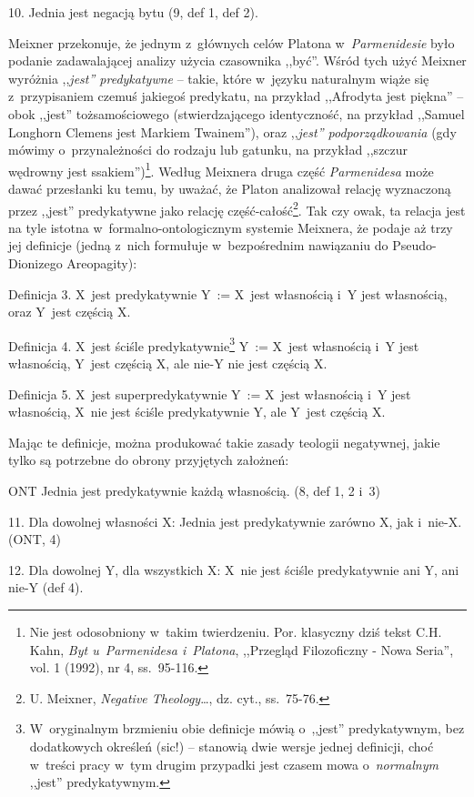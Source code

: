 10. Jednia jest negacją bytu (9, def 1, def 2).

Meixner przekonuje, że jednym z~głównych celów Platona w~\textit{Parmenidesie} było podanie zadawalającej analizy użycia czasownika ,,być''. Wśród tych użyć Meixner wyróżnia ,,\textit{jest'' predykatywne} -- takie, które w~języku naturalnym wiąże się z~przypisaniem czemuś jakiegoś predykatu, na przykład ,,Afrodyta jest piękna'' -- obok ,,jest'' tożsamościowego (stwierdzającego identyczność, na przykład ,,Samuel Longhorn Clemens jest Markiem Twainem''), oraz ,,\textit{jest'' podporządkowania} (gdy mówimy o~przynależności do rodzaju lub gatunku, na przykład ,,szczur wędrowny jest ssakiem'')\footnote{Nie jest odosobniony w~takim twierdzeniu. Por. klasyczny dziś tekst C.H. Kahn, \textit{Byt u~Parmenidesa i~Platona}, ,,Przegląd Filozoficzny - Nowa Seria'', vol. 1 (1992), nr 4, ss.~95-116.}. Według Meixnera druga część \textit{Parmenidesa} może dawać przesłanki ku temu, by uważać, że Platon analizował relację wyznaczoną przez ,,jest'' predykatywne jako relację część-całość\footnote{U. Meixner, \textit{Negative Theology}…, dz. cyt., ss.~75-76.}. Tak czy owak, ta relacja jest na tyle istotna w~formalno-ontologicznym systemie Meixnera, że podaje aż trzy jej definicje (jedną z~nich formułuje w~bezpośrednim nawiązaniu do Pseudo-Dionizego Areopagity):

Definicja 3. X~jest predykatywnie Y~:= X~jest własnością i~Y jest własnością, oraz Y~jest częścią X.

Definicja 4. X~jest ściśle predykatywnie\footnote{W~oryginalnym brzmieniu obie definicje mówią o~,,jest'' predykatywnym, bez dodatkowych określeń (sic!) -- stanowią dwie wersje jednej definicji, choć w~treści pracy w~tym drugim przypadki jest czasem mowa o~\textit{normalnym} ,,jest'' predykatywnym.} Y~:= X~jest własnością i~Y jest własnością, Y~jest częścią X, ale nie-Y nie jest częścią X.

Definicja 5. X~jest superpredykatywnie Y~:= X~jest własnością i~Y jest własnością, X~nie jest ściśle predykatywnie Y, ale Y~jest częścią X.

Mając te definicje, można produkować takie zasady teologii negatywnej, jakie tylko są potrzebne do obrony przyjętych założneń:

ONT Jednia jest predykatywnie każdą własnością. (8, def 1, 2 i~3)

11. Dla dowolnej własności X: Jednia jest predykatywnie zarówno X, jak i~nie-X. (ONT, 4)

12. Dla dowolnej Y, dla wszystkich X: X~nie jest ściśle predykatywnie ani Y, ani nie-Y (def 4).

